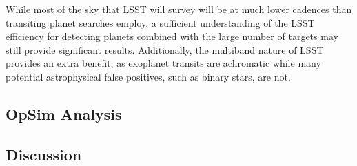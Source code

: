 While most of the sky that LSST will survey will be at much lower cadences than transiting planet searches employ, a sufficient understanding of the LSST efficiency for detecting planets combined with the large number of targets may still provide significant results. Additionally, the multiband nature of LSST provides an extra benefit, as exoplanet transits are achromatic while many potential astrophysical false positives, such as binary stars, are not. 




\subsection{OpSim Analysis}
\label{sec:keyword:analysis}




\subsection{Discussion}
\label{sec:keyword:discussion}


\navigationbar
